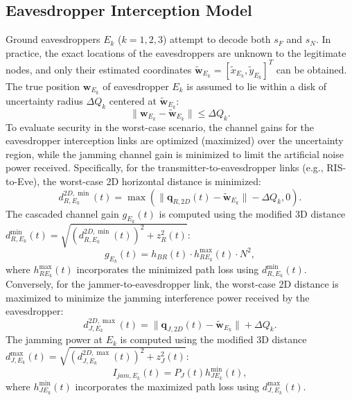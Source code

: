 \documentclass[journal,onecolumn]{IEEEtran}
\begin{document}
\subsection{Eavesdropper Interception Model}
Ground eavesdroppers $E_k$ ($k=1,2,3$) attempt to decode both $s_F$ and $s_N$. In practice, the exact locations of the eavesdroppers are unknown to the legitimate nodes, and only their estimated coordinates $\tilde{\mathbf{w}}_{E_k} = [\tilde{x}_{E_k}, \tilde{y}_{E_k}]^T$ can be obtained. The true position $\mathbf{w}_{E_k}$ of eavesdropper $E_k$ is assumed to lie within a disk of uncertainty radius $\Delta Q_k$ centered at $\tilde{\mathbf{w}}_{E_k}$:
\begin{equation}
    \|\mathbf{w}_{E_k} - \tilde{\mathbf{w}}_{E_k}\| \le \Delta Q_k.
\end{equation}
To evaluate security in the worst-case scenario, the channel gains for the eavesdropper interception links are optimized (maximized) over the uncertainty region, while the jamming channel gain is minimized to limit the artificial noise power received.
Specifically, for the transmitter-to-eavesdropper links (e.g., RIS-to-Eve), the worst-case 2D horizontal distance is minimized:
\begin{equation}
    d_{R, E_k}^{2D, \min}(t) = \max\left( \|\mathbf{q}_{R, 2D}(t) - \tilde{\mathbf{w}}_{E_k}\| - \Delta Q_k, 0 \right).
\end{equation}
The cascaded channel gain $g_{E_k}(t)$ is computed using the modified 3D distance $d_{R, E_k}^{\min}(t) = \sqrt{(d_{R, E_k}^{2D, \min}(t))^2 + z_R^2(t)}$:
\begin{equation}
    g_{E_k}(t) = h_{BR}(t) \cdot h_{RE_k}^{\max}(t) \cdot N^2,
\end{equation}
where $h_{RE_k}^{\max}(t)$ incorporates the minimized path loss using $d_{R, E_k}^{\min}(t)$.
Conversely, for the jammer-to-eavesdropper link, the worst-case 2D distance is maximized to minimize the jamming interference power received by the eavesdropper:
\begin{equation}
    d_{J, E_k}^{2D, \max}(t) = \|\mathbf{q}_{J, 2D}(t) - \tilde{\mathbf{w}}_{E_k}\| + \Delta Q_k.
\end{equation}
The jamming power at $E_k$ is computed using the modified 3D distance $d_{J, E_k}^{\max}(t) = \sqrt{(d_{J, E_k}^{2D, \max}(t))^2 + z_J^2(t)}$:
\begin{equation}
    I_{jam, E_k}(t) = P_J(t) h_{JE_k}^{\min}(t),
\end{equation}
where $h_{JE_k}^{\min}(t)$ incorporates the maximized path loss using $d_{J, E_k}^{\max}(t)$.
\end{document}
